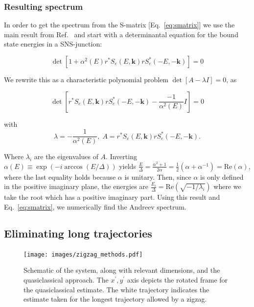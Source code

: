 		\subsubsection{Resulting spectrum}
			In order to get the spectrum from the S-matrix [Eq.~\eqref{eq:smatrix}] we use the main result from Ref.~\cite{beenakker1991universal} and start with a determinantal equation for the bound state energies in a SNS-junction:

			\begin{equation}
			\det\left[1+\alpha^{2}\left(E\right)r^{*}S_{e}\left(E,\bm{k}\right)rS_{e}^{*}\left(-E,-\bm{k}\right)\right]=0
			\label{eq:bound_state_condition_sjl}
			\end{equation}

			We rewrite this as a characteristic polynomial problem $\det\left[A-\lambda I\right]=0$, as

			\begin{equation}
			\det\left[r^{*}S_{e}\left(E,\bm{k}\right)rS_{e}^{*}\left(-E,-\bm{k}\right)-\frac{-1}{\alpha^{2}\left(E\right)}I\right]=0
			\end{equation}

			with
			\begin{equation}
			\lambda=-\frac{1}{\alpha^{2}\left(E\right)},\;A=r^{*}S_{e}\left(E,\bm{k}\right)rS_{e}^{*}\left(-E,-\bm{k}\right).
			\end{equation}

			Where $\lambda_i$ are the eigenvalues of $A$.
			Inverting $\alpha\left(E\right)\equiv\exp\left(-i\arccos\left(E/\Delta\right)\right)$ yields $\frac{E}{\Delta}=\frac{\alpha^{2}+1}{2\alpha}=\frac{1}{2}\left(\alpha+\alpha^{-1}\right)=\textrm{Re}(\alpha)$, where the last equality holds because $\alpha$ is unitary.
			Then, since $\alpha$ is only defined in the positive imaginary plane, the energies are $\frac{E_{i}}{\Delta}=\textrm{Re}\left(\sqrt{-1/\lambda_{i}}\right)$ where we take the root which has a positive imaginary part.
			Using this result and Eq.~\eqref{eq:smatrix}, we numerically find the Andreev spectrum.

	\subsection{Eliminating long trajectories}

		\begin{figure}[!htb]
		\centering
		\texttt{[image: images/zigzag\_methods.pdf]}
		\caption{Schematic of the system, along with relevant dimensions, and the quasiclassical approach.
		The $x^\prime, y^\prime$ axis depicts the rotated frame for the quasiclassical estimate.
		The white trajectory indicates the estimate taken for the longest trajectory allowed by a zigzag.
		\label{fig:zigzag_methods}}
		\end{figure}

